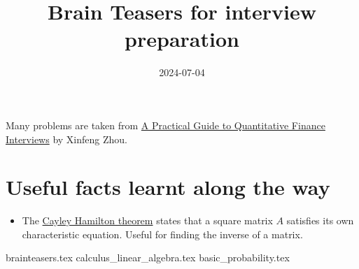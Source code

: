 \documentclass{article}
\date{2024-07-04}
\title{Brain Teasers for interview preparation}
\begin{document}
  \maketitle
  Many problems are taken from \href{https://academyflex.com/wp-content/uploads/2024/03/a-practical-guide-to-quantitative-finance-interviews.pdf}{A Practical Guide to Quantitative Finance Interviews} by Xinfeng Zhou.
  \tableofcontents

  \newpage

  \section{Useful facts learnt along the way}

  \begin{itemize}
    \item The \href{https://en.wikipedia.org/wiki/Cayley\%E2\%80\%93Hamilton_theorem}{Cayley Hamilton theorem} states that a square matrix $A$ satisfies its own characteristic equation. Useful for finding the inverse of a matrix.
  \end{itemize}

  {brainteasers.tex}
  \newpage
  {calculus_linear_algebra.tex}
  \newpage
  {basic_probability.tex}
  \newpage
  
  
\end{document}
